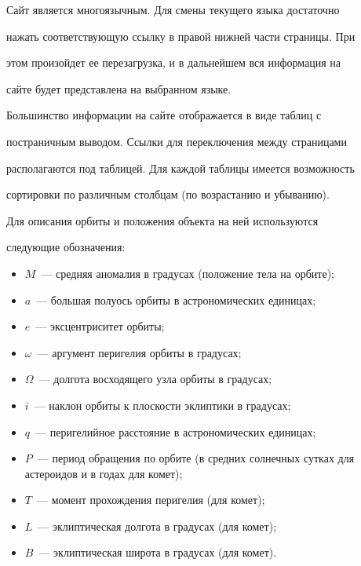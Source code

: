 Сайт является многоязычным. Для смены текущего языка достаточно


нажать соответствующую ссылку в правой нижней части страницы. При


этом произойдет ее перезагрузка, и в дальнейшем вся информация на


сайте будет представлена на выбранном языке.





Большинство информации на сайте отображается в виде таблиц с


постраничным выводом. Ссылки для переключения между страницами


располагаются под таблицей. Для каждой таблицы имеется возможность


сортировки по различным столбцам (по возрастанию и убыванию).





Для описания орбиты и положения объекта на ней используются


следующие обозначения:


\begin{itemize}


\item[]$M$~--- средняя аномалия в градусах (положение тела на орбите);


\item[]$a$~--- большая полуось орбиты в астрономических единицах;


\item[]$e$~--- эксцентриситет орбиты;


\item[]$\omega$~--- аргумент перигелия орбиты в градусах;


\item[]$\Omega$~--- долгота восходящего узла орбиты в градусах;


\item[]$i$~--- наклон орбиты к плоскости эклиптики в градусах;


\item[]$q$~--- перигелийное расстояние в астрономических единицах;


\item[]$P$~--- период обращения по орбите (в средних солнечных сутках для астероидов и в годах для комет);


\item[]$T$~--- момент прохождения перигелия (для комет);


\item[]$L$~--- эклиптическая долгота в градусах (для комет);


\item[]$B$~--- эклиптическая широта в градусах (для комет).


\end{itemize}





